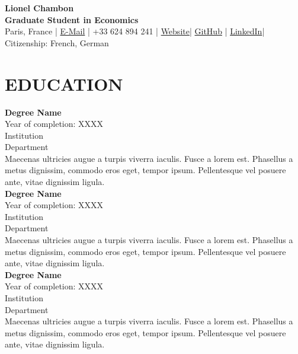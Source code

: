 \documentclass[a4paper,9pt]{extarticle}
\begin{document}
\pagestyle{empty}

\begin{center}
\textbf{\Large Lionel Chambon }\\[3pt] %
\textbf{Graduate Student in Economics}\\[1pt] %
Paris, France | \href{mailto:lionel.chambon@sciencespo.fr}{E-Mail} | +33 624 894 241 | \href{www.lionelchambon.github.io}{Website}| \href{www.github.com/lionelchambon}{GitHub} | \href{www.linkedin.com/in/lionel-chambon-500b64187}{LinkedIn}| Citizenship: French, German %
\end{center}


\section*{EDUCATION}

\noindent
\newline
\textbf{Degree Name} \\
Year of completion: XXXX \\ 
Institution \\ 
Department \\
Maecenas ultricies augue a turpis viverra iaculis. Fusce a lorem est. Phasellus a metus dignissim, commodo eros eget, tempor ipsum. Pellentesque vel posuere ante, vitae dignissim ligula. \\

\noindent
\textbf{Degree Name} \\
Year of completion: XXXX \\ 
Institution \\ 
Department \\
Maecenas ultricies augue a turpis viverra iaculis. Fusce a lorem est. Phasellus a metus dignissim, commodo eros eget, tempor ipsum. Pellentesque vel posuere ante, vitae dignissim ligula. \\

\noindent
\textbf{Degree Name} \\
Year of completion: XXXX \\ 
Institution \\ 
Department  \\
Maecenas ultricies augue a turpis viverra iaculis. Fusce a lorem est. Phasellus a metus dignissim, commodo eros eget, tempor ipsum. Pellentesque vel posuere ante, vitae dignissim ligula. 

\end{document}
